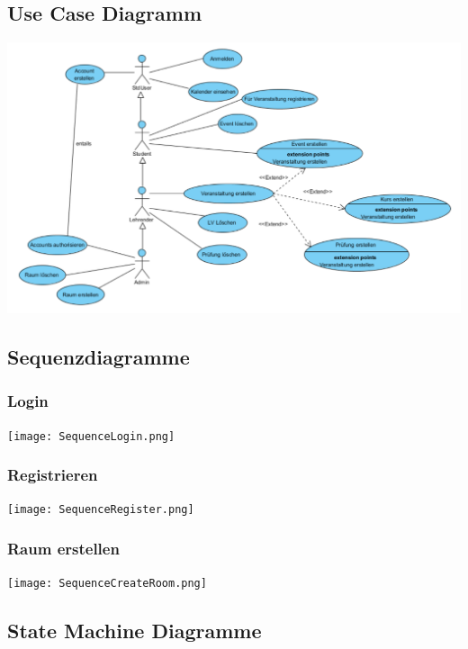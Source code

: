 \documentclass[a4paper,12pt]{article}
\begin{document}
	\subsection*{Use Case Diagramm}
	\begin{center}
		\includegraphics[scale=.5,angle=90]{UseCaseDiagram.png}
	\end{center}
	\subsection*{Sequenzdiagramme}
		\subsubsection*{Login}
			\begin{center}
				\texttt{[image: SequenceLogin.png]}
			\end{center}
		\subsubsection*{Registrieren}
			\begin{center}
				\texttt{[image: SequenceRegister.png]}
			\end{center}
		\subsubsection*{Raum erstellen}
			\begin{center}
				\texttt{[image: SequenceCreateRoom.png]}
			\end{center}
	\subsection*{State Machine Diagramme}
\end{document}

